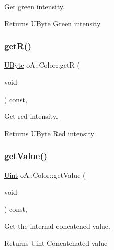 Get green intensity. 

\begin{DoxyReturn}{Returns}
U\+Byte Green intensity 
\end{DoxyReturn}
\mbox{\label{classo_a_1_1_color_af53e0f3c94638ab041fe05ce7356c2d8}} 
\subsubsection{\texorpdfstring{get\+R()}{getR()}}
{\footnotesize\ttfamily \mbox{\hyperlink{namespaceo_a_a8c38e43a304d568b8495770dd8d50513}{U\+Byte}} o\+A\+::\+Color\+::getR (\begin{DoxyParamCaption}\item[{void}]{ }\end{DoxyParamCaption}) const\hspace{0.3cm}{\ttfamily [inline]}, {\ttfamily [noexcept]}}



Get red intensity. 

\begin{DoxyReturn}{Returns}
U\+Byte Red intensity 
\end{DoxyReturn}
\mbox{\label{classo_a_1_1_color_ac010d6318a14cebb3123929159fbab93}} 
\subsubsection{\texorpdfstring{get\+Value()}{getValue()}}
{\footnotesize\ttfamily \mbox{\hyperlink{namespaceo_a_abe1d8250226c5cf34f84d7b75fc7922e}{Uint}} o\+A\+::\+Color\+::get\+Value (\begin{DoxyParamCaption}\item[{void}]{ }\end{DoxyParamCaption}) const\hspace{0.3cm}{\ttfamily [inline]}, {\ttfamily [noexcept]}}



Get the internal concatened value. 

\begin{DoxyReturn}{Returns}
Uint Concatenated value 
\end{DoxyReturn}
\mbox{\label{classo_a_1_1_color_ae637744de31ea0e978b58a836db49884}} 

